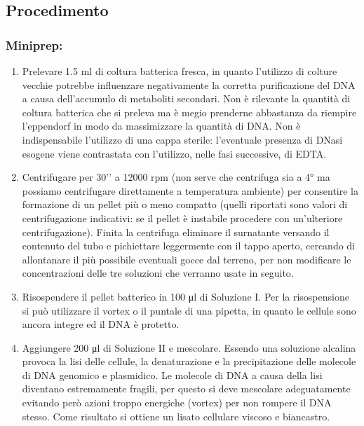 \subsection{Procedimento}

\subsubsection{Miniprep: }

\begin{enumerate}
  \item Prelevare 1.5 ml di coltura batterica fresca, in quanto l’utilizzo di colture vecchie potrebbe
	influenzare negativamente la corretta purificazione del DNA a causa dell’accumulo di metaboliti secondari.
	Non è rilevante la quantità di coltura batterica che si preleva ma \`e megio prenderne abbastanza da riempire
	l’eppendorf in modo da massimizzare la quantità di DNA. Non è indispensabile l’utilizzo di una cappa sterile:
	l’eventuale presenza di DNasi esogene viene contrastata con l’utilizzo, nelle fasi successive, di EDTA.
  \item Centrifugare per 30’’ a 12000 rpm (non serve che centrifuga sia a 4° ma possiamo centrifugare direttamente
	a temperatura ambiente) per consentire la formazione di un pellet più o meno
	compatto (quelli riportati sono valori di centrifugazione indicativi: se il pellet è instabile procedere
	con un’ulteriore centrifugazione). Finita la centrifuga eliminare il surnatante versando il contenuto del tubo e
	pichiettare leggermente con il tappo aperto, cercando di allontanare il più possibile eventuali gocce dal terreno,
	per non modificare le concentrazioni delle tre soluzioni che verranno usate in seguito.

  \item Risospendere il pellet batterico in 100 μl di Soluzione I. Per la risospensione si può utilizzare il vortex o
	il puntale di una pipetta, in quanto le cellule sono ancora integre ed il DNA è protetto.

  \item Aggiungere 200 μl di Soluzione II e mescolare. Essendo una soluzione alcalina provoca la lisi delle cellule,
	la denaturazione e la  precipitazione delle molecole di DNA genomico e plasmidico.
	Le molecole di DNA a causa della lisi diventano estremamente fragili, per questo si deve mescolare
	adeguatamente evitando per\`o azioni troppo energiche (vortex) per non rompere il DNA stesso.
	Come risultato si ottiene un lisato cellulare viscoso e biancastro.


\end{enumerate}
